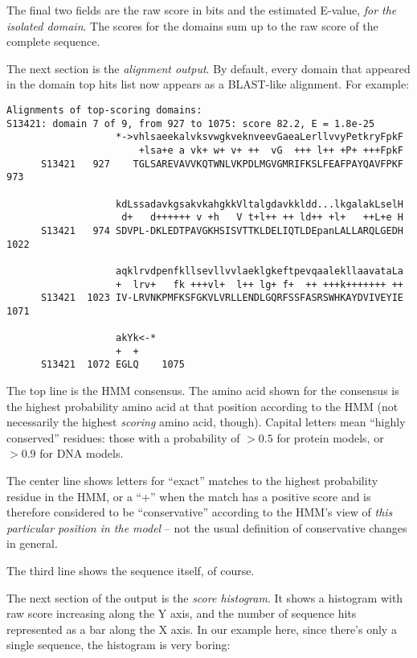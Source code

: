 The final two fields are the raw score in bits and the estimated
E-value, {\em for the isolated domain}.  The scores for the domains
sum up to the raw score of the complete sequence.

The next section is the {\em alignment output}. By default, every
domain that appeared in the domain top hits list now appears as a
BLAST-like alignment. For example:

{\small\begin{verbatim}
Alignments of top-scoring domains:
S13421: domain 7 of 9, from 927 to 1075: score 82.2, E = 1.8e-25
                   *->vhlsaeekalvksvwgkveknveevGaeaLerllvvyPetkryFpkF
                       +lsa+e a vk+ w+ v+ ++  vG  +++ l++ +P+ +++FpkF
      S13421   927    TGLSAREVAVVKQTWNLVKPDLMGVGMRIFKSLFEAFPAYQAVFPKF 973  

                   kdLssadavkgsakvkahgkkVltalgdavkkldd...lkgalakLselH
                    d+   d++++++ v +h   V t+l++ ++ ld++ +l+   ++L+e H
      S13421   974 SDVPL-DKLEDTPAVGKHSISVTTKLDELIQTLDEpanLALLARQLGEDH 1022 

                   aqklrvdpenfkllsevllvvlaeklgkeftpevqaalekllaavataLa
                   +  lrv+   fk +++vl+  l++ lg+ f+  ++ +++k+++++++ ++
      S13421  1023 IV-LRVNKPMFKSFGKVLVRLLENDLGQRFSSFASRSWHKAYDVIVEYIE 1071 

                   akYk<-*
                   +  +   
      S13421  1072 EGLQ    1075 
\end{verbatim}}

The top line is the HMM consensus. The amino acid shown for the
consensus is the highest probability amino acid at that position
according to the HMM (not necessarily the highest {\em scoring} amino
acid, though). Capital letters mean ``highly conserved'' residues:
those with a probability of $> 0.5$ for protein models, or $> 0.9$ for
DNA models. 

The center line shows letters for ``exact'' matches to the highest
probability residue in the HMM, or a ``+'' when the match has a
positive score and is therefore considered to be ``conservative''
according to the HMM's view of {\em this particular position in the
model} -- not the usual definition of conservative changes in general.

The third line shows the sequence itself, of course.

The next section of the output is the {\em score histogram}.  It shows
a histogram with raw score increasing along the Y axis, and the number
of sequence hits represented as a bar along the X axis. In our example
here, since there's only a single sequence, the histogram is very
boring:

